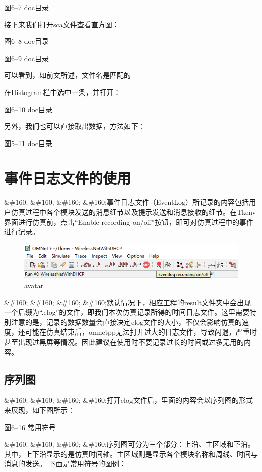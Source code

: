 图6--7 doc目录

接下来我们打开sca文件查看直方图：

图6--8 doc目录

图6--9 doc目录

可以看到，如前文所述，文件名是匹配的

在Histogram栏中选中一条，并打开：

图6--10 doc目录

另外，我们也可以直接取出数据，方法如下：

图5--11 doc目录

\section{事件日志文件的使用}
\label{事件日志文件的使用}

\&\#160; \&\#160; \&\#160; \&\#160;事件日志文件（EventLog）所记录的内容包括用户仿真过程中各个模块发送的消息细节以及提示发送和消息接收的细节。在Tkenv界面进行仿真前，点击“Enable recording on\slash off”按钮，即可对仿真过程中的事件进行记录。

\begin{figure}[htbp]
\centering
\includegraphics[keepaspectratio,width=\textwidth,height=0.75\textheight]{./../img/chapter6/6-12.png}
\caption{avatar}
\end{figure}

\&\#160; \&\#160; \&\#160; \&\#160;默认情况下，相应工程的result文件夹中会出现一个后缀为“.elog”的文件，即我们本次仿真记录所得的时间日志文件。这里需要特别注意的是，记录的数据数量会直接决定elog文件的大小，不仅会影响仿真的速度，还可能在仿真结束后，omnetpp无法打开过大的日志文件，导致闪退，严重时甚至出现过黑屏等情况。因此建议在使用时不要记录过长的时间或过多无用的内容。

\subsection{序列图}
\label{序列图}

\&\#160; \&\#160; \&\#160; \&\#160;打开elog文件后，里面的内容会以序列图的形式来展现，如下图所示：

图6--16 常用符号

\&\#160; \&\#160; \&\#160; \&\#160;序列图可分为三个部分：上沿、主区域和下沿。其中，上下沿显示的是仿真时间轴。主区域则是显示各个模块名称和周线、时间与消息的发送。
下面是常用符号的图例：

